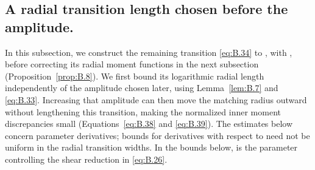 \subsection{A radial transition length chosen before the amplitude.}\label{sec:B.7}
In this subsection, we construct the remaining transition \eqref{eq:B.34} to
, with
, before correcting its radial moment functions in the next subsection
(Proposition~\ref{prop:B.8}). We first bound its logarithmic radial length
 independently of the amplitude
 chosen later, using Lemma~\ref{lem:B.7} and \eqref{eq:B.33}. Increasing that amplitude can then move the matching radius
 outward without lengthening this transition, making the normalized inner moment discrepancies
small (Equations~\eqref{eq:B.38} and \eqref{eq:B.39}). The estimates below concern parameter derivatives;
bounds for derivatives with respect to  need not be uniform in the radial transition widths.
In the bounds below,  is the parameter controlling the shear reduction in \eqref{eq:B.26}.


